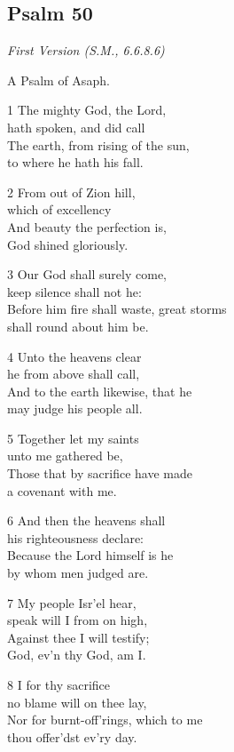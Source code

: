 \begin{center}
\quad{}\quad{}
\end{center}

\subsection*{Psalm 50}

\emph{First Version (S.M., 6.6.8.6)}

A Psalm of Asaph.

1 The mighty God, the Lord,\\
hath spoken, and did call\\
The earth, from rising of the sun,\\
to where he hath his fall.

2 From out of Zion hill,\\
which of excellency\\
And beauty the perfection is,\\
God shined gloriously.

3 Our God shall surely come,\\
keep silence shall not he:\\
Before him fire shall waste, great storms\\
shall round about him be.

4 Unto the heavens clear\\
he from above shall call,\\
And to the earth likewise, that he\\
may judge his people all.

5 Together let my saints\\
unto me gathered be,\\
Those that by sacrifice have made\\
a covenant with me.

6 And then the heavens shall\\
his righteousness declare:\\
Because the Lord himself is he\\
by whom men judged are.

7 My people Isr’el hear,\\
speak will I from on high,\\
Against thee I will testify;\\
God, ev’n thy God, am I.

8 I for thy sacrifice\\
no blame will on thee lay,\\
Nor for burnt-off’rings, which to me\\
thou offer’dst ev’ry day.

